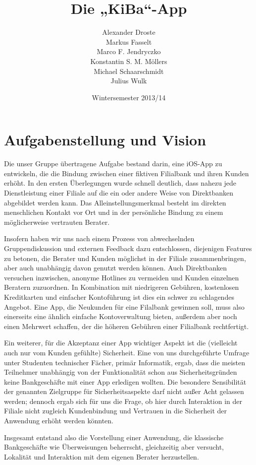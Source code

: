 \documentclass[a4paper, 12pt]{scrartcl}
\author{%
	Alexander Droste\vphantom{yMö}\\[-12pt]
    Markus Fasselt\vphantom{yöM}\\[-12pt]
    Marco F. Jendryczko\vphantom{yMö}\\[-12pt]
    Konstantin S. M. Möllers \vphantom{yMö}\\[-12pt]
    Michael Schaarschmidt\vphantom{yöM}\\[-12pt]
    Julius Wulk\vphantom{yMö}}
\title{Die „KiBa“-App}
\date{Wintersemester 2013/14}
\begin{document}
	
    
    \newpage
    
    \tableofcontents
    \newpage
    
    \section{Aufgabenstellung und Vision}
	Die unser Gruppe übertragene Aufgabe bestand darin, eine iOS-App zu entwickeln, die die Bindung zwischen einer fiktiven Filialbank und ihren Kunden erhöht. In den ersten Ü\-ber\-le\-gung\-en wurde schnell deutlich, dass nahezu jede Dienstleistung einer Filiale auf die ein oder andere Weise von Direktbanken abgebildet werden kann. Das Alleinstellungsmerkmal besteht im direkten menschlichen Kontakt vor Ort und in der persönliche Bindung zu einem möglicherweise vertrauten Berater. 
    
Insofern haben wir uns nach einem Prozess von abwechselnden Gruppendiskussion und externen Feedback dazu entschlossen, diejenigen Features zu betonen, die Berater und Kunden möglichst in der Filiale zusammenbringen, aber auch unabhängig davon genutzt werden können. Auch Direktbanken versuchen inzwischen, anonyme Hotlines zu vermeiden und Kunden einzelnen Beratern zuzuordnen. In Kombination mit niedrigeren Gebühren, kostenlosen Kreditkarten und einfacher Kontoführung ist dies ein schwer zu schlagendes Angebot. Eine App, die Neukunden für eine Filalbank gewinnen soll, muss also einerseits eine ähnlich einfache Kontoverwaltung bieten, außerdem aber noch einen Mehrwert schaffen, der die höheren Gebühren einer Filialbank rechtfertigt.

Ein weiterer, für die Akzeptanz einer App wichtiger Aspekt ist die (vielleicht auch nur vom Kunden gefühlte) Sicherheit. Eine von uns durchgeführte Umfrage unter Studenten technischer Fächer, primär Informatik, ergab, dass die meisten Teilnehmer unabhängig von der Funktionalität schon aus Sicherheitsgründen keine Bankgeschäfte mit einer App erledigen wollten. Die besondere Sensibilität der genannten Zielgruppe für Sicherheitsaspekte darf nicht außer Acht gelassen werden; dennoch ergab sich für uns die Frage, ob hier durch Interaktion in der Filiale nicht zugleich Kundenbindung und Vertrauen in die Sicherheit der Anwendung erhöht werden könnten. 

Insgesamt entstand also die Vorstellung einer Anwendung, die klassische Bankgeschäfte wie Überweisungen beherrscht, gleichzeitig aber versucht, Lokalität und Interaktion mit dem eigenen Berater herzustellen. 
     
\end{document}
